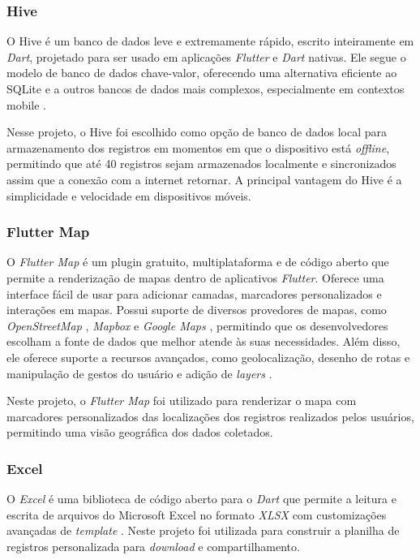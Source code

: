 \subsubsection{Hive}

O Hive é um banco de dados leve e extremamente rápido, escrito inteiramente 
em \textit{Dart}, projetado para ser usado em aplicações \textit{Flutter} e 
\textit{Dart} nativas. Ele segue o modelo de banco de dados chave-valor, 
oferecendo uma alternativa eficiente ao SQLite e a outros bancos de dados 
mais complexos, especialmente em contextos mobile \cite{hive2025}.

Nesse projeto, o Hive foi escolhido como opção de banco de dados local para armazenamento dos registros em momentos em que o dispositivo está \textit{offline}, 
permitindo que até 40 registros sejam armazenados localmente e sincronizados assim que a conexão com a internet retornar.
A principal vantagem do Hive é a simplicidade e velocidade em dispositivos móveis.

\subsubsection{Flutter Map}
O \textit{Flutter Map} é um plugin gratuito, multiplataforma e de código aberto
que permite a renderização de mapas dentro de aplicativos \textit{Flutter}. Oferece uma interface fácil de usar para adicionar camadas, marcadores personalizados e interações em mapas.
Possui suporte de diversos provedores de mapas, como \textit{OpenStreetMap} \cite{openstreetmap2025}, \textit{Mapbox} \cite{mapbox2025} e \textit{Google Maps} \cite{googlemaps2025}, permitindo que os desenvolvedores escolham a fonte de dados que melhor atende às suas necessidades. Além disso, ele oferece suporte a recursos avançados, como geolocalização, desenho de rotas e manipulação de gestos do usuário e adição de \textit{layers} \cite{flutter_map_doc}.
 
Neste projeto, o \textit{Flutter Map} foi utilizado para renderizar o mapa com marcadores personalizados das localizações dos registros realizados pelos usuários, permitindo uma visão geográfica dos dados coletados.

\subsubsection{Excel}

O \textit{Excel} é uma biblioteca de código aberto para o \textit{Dart} que permite a leitura e escrita de arquivos do Microsoft Excel no formato \textit{XLSX} com customizações avançadas de \textit{template} \cite{excel_flutter}. Neste projeto foi utilizada para construir a planilha de registros personalizada para \textit{download} e compartilhamento.

